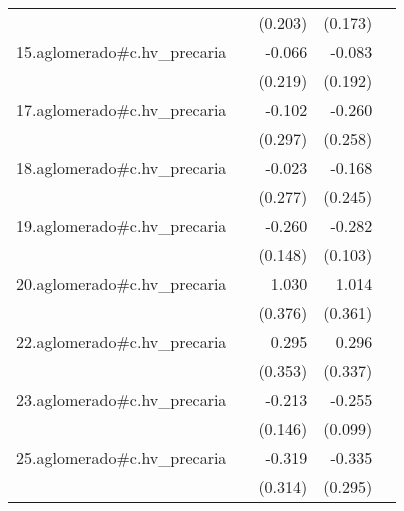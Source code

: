 {\begin{longtable}{l*{4}{D{.}{.}{-1}}}
            &                     &     (0.203)         &     (0.173)         &                     \\
\addlinespace
15.aglomerado#c.hv\_precaria&                     &      -0.066         &      -0.083         &                     \\
            &                     &     (0.219)         &     (0.192)         &                     \\
\addlinespace
17.aglomerado#c.hv\_precaria&                     &      -0.102         &      -0.260         &                     \\
            &                     &     (0.297)         &     (0.258)         &                     \\
\addlinespace
18.aglomerado#c.hv\_precaria&                     &      -0.023         &      -0.168         &                     \\
            &                     &     (0.277)         &     (0.245)         &                     \\
\addlinespace
19.aglomerado#c.hv\_precaria&                     &      -0.260         &      -0.282\sym{**} &                     \\
            &                     &     (0.148)         &     (0.103)         &                     \\
\addlinespace
20.aglomerado#c.hv\_precaria&                     &       1.030\sym{**} &       1.014\sym{**} &                     \\
            &                     &     (0.376)         &     (0.361)         &                     \\
\addlinespace
22.aglomerado#c.hv\_precaria&                     &       0.295         &       0.296         &                     \\
            &                     &     (0.353)         &     (0.337)         &                     \\
\addlinespace
23.aglomerado#c.hv\_precaria&                     &      -0.213         &      -0.255\sym{**} &                     \\
            &                     &     (0.146)         &     (0.099)         &                     \\
\addlinespace
25.aglomerado#c.hv\_precaria&                     &      -0.319         &      -0.335         &                     \\
            &                     &     (0.314)         &     (0.295)         &                     \\

\end{longtable}}

